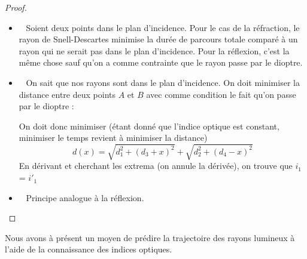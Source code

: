 \documentclass{classe}
\newcommand{\point}[3]{\draw (#1 -.1, #2 -.1) -- (#1 + .1, #2 + .1);
\draw (#1 +.1, #2 -.1) -- (#1 - .1, #2 + .1);
\draw (#1, #2) node[below right]{#3};}
\begin{document}
\begin{proof}
\begin{itemize}
	\item \color{vulm}{Plan d'incidence :}\ \color{black} Soient deux points dans le plan d'incidence. Pour le cas de la réfraction, le rayon de Snell-Descartes minimise la durée de parcours totale comparé à un rayon qui ne serait pas dans le plan d'incidence. Pour la réflexion, c'est la même chose sauf qu'on a comme contrainte que le rayon passe par le dioptre.
	\item \color{vulm}{Réflexion :}\ \color{black} On sait que nos rayons sont dans le plan d'incidence. On doit minimiser la distance entre deux points $A$ et $B$ avec comme condition le fait qu'on passe par le dioptre :
	\begin{figure}[H]
	\centering
	\end{figure}
	\noindent On doit donc minimiser (étant donné que l'indice optique est constant, minimiser le temps revient à minimiser la distance)
	\begin{equation*}
	d(x) = \sqrt{d_1^2+(d_3+x)^2} + \sqrt{d_2^2+(d_4-x)^2}
	\end{equation*}
	En dérivant et cherchant les extrema (on annule la dérivée), on trouve que $i_1$ = $i'_1$
	\item \color{vulm}{Réfraction :}\ \color{black} Principe analogue à la réflexion.
	
\end{itemize}
\end{proof}
Nous avons à présent un moyen de prédire la trajectoire des rayons lumineux à l'aide de la connaissance des indices optiques.
\end{document}
